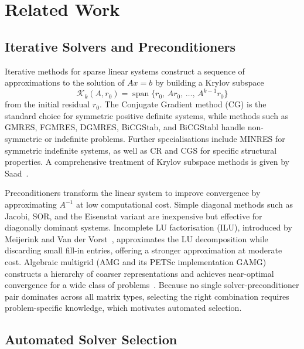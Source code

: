 
\chapter{Related Work}\label{chapter:related-work}

\section{Iterative Solvers and Preconditioners}\label{sec:solvers-background}

Iterative methods for sparse linear systems construct a sequence of approximations to the
solution of $Ax = b$ by building a Krylov subspace
\[
  \mathcal{K}_k(A, r_0) = \operatorname{span}\{r_0,\, Ar_0,\, \ldots,\, A^{k-1}r_0\}
\]
from the initial residual $r_0$.
The Conjugate Gradient method (CG) is the standard choice for symmetric positive definite
systems, while methods such as GMRES, FGMRES, DGMRES, BiCGStab, and BiCGStabl handle
non-symmetric or indefinite problems.
Further specialisations include MINRES for symmetric indefinite systems, as well as CR and
CGS for specific structural properties.
A comprehensive treatment of Krylov subspace methods is given by Saad~\cite{saad2003iterative}.

Preconditioners transform the linear system to improve convergence by approximating
$A^{-1}$ at low computational cost.
Simple diagonal methods such as Jacobi, SOR, and the Eisenstat variant are inexpensive but
effective for diagonally dominant systems.
Incomplete LU factorisation (ILU), introduced by Meijerink and Van der
Vorst~\cite{meijerink1977iterative}, approximates the LU decomposition while discarding
small fill-in entries, offering a stronger approximation at moderate cost.
Algebraic multigrid (AMG and its PETSc implementation GAMG) constructs a hierarchy of
coarser representations and achieves near-optimal convergence for a wide class of
problems~\cite{stuben2001review}.
Because no single solver-preconditioner pair dominates across all matrix types, selecting
the right combination requires problem-specific knowledge, which motivates automated
selection.

\section{Automated Solver Selection}\label{sec:automated-selection}

